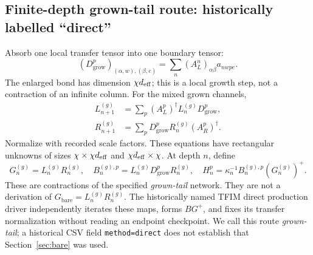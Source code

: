 \documentclass[11pt]{article}
\newcommand{\Dg}{D_{\mathrm{grow}}}
\newcommand{\Gz}{G_{\mathrm{bare}}}
\newcommand{\code}[1]{{\small\nolinkurl{#1}}}
\begin{document}
\FloatBarrier
\subsection{Finite-depth grown-tail route: historically labelled ``direct''}
\label{sec:grown}
Absorb one local transfer tensor into one boundary tensor:
\begin{equation}\label{eq:grow}
 (\Dg^p)_{(\alpha,w),(\beta,e)}
   =\sum_n(A_L^n)_{\alpha\beta}a_{nwpe}.
\end{equation}
The enlarged bond has dimension $\chi d_{\rm eff}$; this is a local growth
step, not a contraction of an infinite column. For the mixed grown channels,
\begin{align}\label{eq:grownmaps}
 L_{n+1}^{(g)}&=\sum_p(A_L^p)^\dagger L_n^{(g)}\Dg^p,\\
 R_{n+1}^{(g)}&=\sum_p\Dg^p R_n^{(g)}(A_R^p)^\dagger.
\end{align}
Normalize with recorded scale factors. These equations have rectangular
unknowns of sizes $\chi\times\chi d_{\rm eff}$ and
$\chi d_{\rm eff}\times\chi$. At depth $n$, define
\begin{equation}\label{eq:finitegrown}
 G_n^{(g)}=L_n^{(g)}R_n^{(g)},\quad
 B_n^{(g),p}=L_n^{(g)}\Dg^pR_n^{(g)},\quad
 H_n^p=\kappa_n^{-1}B_n^{(g),p}(G_n^{(g)})^+.
\end{equation}
These are contractions of the specified \emph{grown-tail} network. They are
not a derivation of $\Gz=L_n^{(g)}R_n^{(g)}$.
The historically named TFIM direct production driver independently iterates these maps,
forms $BG^+$, and fixes its transfer normalization without reading an endpoint
checkpoint. We call this route \emph{grown-tail}; a historical CSV field
\code{method=direct} does not establish that Section~\ref{sec:bare} was used.
\end{document}
